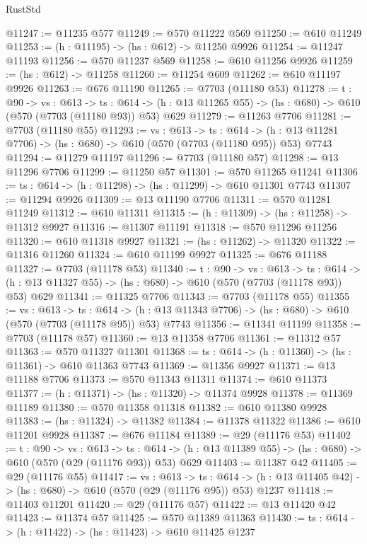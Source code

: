 \begin{lexlean}{RustStd}
\begin{coremodule}
@11247 := @11235 @577
@11249 := @570 @11222 @569
@11250 := @610 @11249
@11253 := (h : @11195) -> (hs : @612) -> @11250 @9926
@11254 := @11247 @11193
@11256 := @570 @11237 @569
@11258 := @610 @11256 @9926
@11259 := (hs : @612) -> @11258
@11260 := @11254 @609
@11262 := @610 @11197 @9926
@11263 := @676 @11190
@11265 := @7703 (@11180 @53)
@11278 := {t : @90} ->
  {vs : @613} ->
  {ts : @614} -> (h : @13 @11265 @55) -> (hs : @680) -> @610 (@570 (@7703 (@11180 @93)) @53) @629
@11279 := @11263 @7706
@11281 := @7703 (@11180 @55)
@11293 := {vs : @613} ->
  {ts : @614} -> (h : @13 @11281 @7706) -> (hs : @680) -> @610 (@570 (@7703 (@11180 @95)) @53) @7743
@11294 := @11279 @11197
@11296 := @7703 (@11180 @57)
@11298 := @13 @11296 @7706
@11299 := @11250 @57
@11301 := @570 @11265 @11241
@11306 := {ts : @614} -> (h : @11298) -> (hs : @11299) -> @610 @11301 @7743
@11307 := @11294 @9926
@11309 := @13 @11190 @7706
@11311 := @570 @11281 @11249
@11312 := @610 @11311
@11315 := (h : @11309) -> (hs : @11258) -> @11312 @9927
@11316 := @11307 @11191
@11318 := @570 @11296 @11256
@11320 := @610 @11318 @9927
@11321 := (hs : @11262) -> @11320
@11322 := @11316 @11260
@11324 := @610 @11199 @9927
@11325 := @676 @11188
@11327 := @7703 (@11178 @53)
@11340 := {t : @90} ->
  {vs : @613} ->
  {ts : @614} -> (h : @13 @11327 @55) -> (hs : @680) -> @610 (@570 (@7703 (@11178 @93)) @53) @629
@11341 := @11325 @7706
@11343 := @7703 (@11178 @55)
@11355 := {vs : @613} ->
  {ts : @614} -> (h : @13 @11343 @7706) -> (hs : @680) -> @610 (@570 (@7703 (@11178 @95)) @53) @7743
@11356 := @11341 @11199
@11358 := @7703 (@11178 @57)
@11360 := @13 @11358 @7706
@11361 := @11312 @57
@11363 := @570 @11327 @11301
@11368 := {ts : @614} -> (h : @11360) -> (hs : @11361) -> @610 @11363 @7743
@11369 := @11356 @9927
@11371 := @13 @11188 @7706
@11373 := @570 @11343 @11311
@11374 := @610 @11373
@11377 := (h : @11371) -> (hs : @11320) -> @11374 @9928
@11378 := @11369 @11189
@11380 := @570 @11358 @11318
@11382 := @610 @11380 @9928
@11383 := (hs : @11324) -> @11382
@11384 := @11378 @11322
@11386 := @610 @11201 @9928
@11387 := @676 @11184
@11389 := @29 (@11176 @53)
@11402 := {t : @90} ->
  {vs : @613} ->
  {ts : @614} -> (h : @13 @11389 @55) -> (hs : @680) -> @610 (@570 (@29 (@11176 @93)) @53) @629
@11403 := @11387 @42
@11405 := @29 (@11176 @55)
@11417 := {vs : @613} ->
  {ts : @614} -> (h : @13 @11405 @42) -> (hs : @680) -> @610 (@570 (@29 (@11176 @95)) @53) @1237
@11418 := @11403 @11201
@11420 := @29 (@11176 @57)
@11422 := @13 @11420 @42
@11423 := @11374 @57
@11425 := @570 @11389 @11363
@11430 := {ts : @614} -> (h : @11422) -> (hs : @11423) -> @610 @11425 @1237

\end{coremodule}
\end{lexlean}
